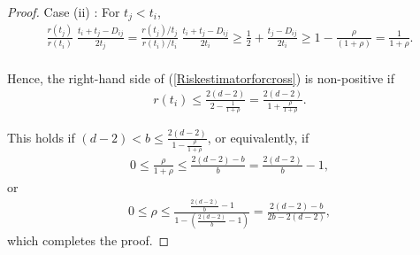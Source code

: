 \documentclass[10pt,a4paper]{amsart}
\begin{document}
\begin{proof}
{Case (ii) \hspace{-1mm}:} For $t_j < t_i$, 
  \begin{align}
   \nonumber   \frac{r(t_j)}{r(t_i)}\; \frac{t_i + t_j - D_{ij}}{2t_j} =  \frac{r(t_j)/t_j}{r(t_i)/t_i} \; \frac{t_i + t_j - D_{ij}}{2t_i}  \geq \frac{1}{2} + \frac{t_j  - D_{ij}}{2t_i}\geq 1 - \frac{\rho }{(1 + \rho)} = \frac{1}{1 + \rho}.
  \end{align}
\\


Hence, the right-hand side of (\ref{Riskestimatorforcross}) is non-positive if
\begin{align}
   \nonumber  r(t_i) \leq \frac{2(d - 2)}{2 - \frac{1}{1 + \rho}} = \frac{2(d - 2)}{1 + \frac{\rho}{1 + \rho}}.
\end{align}

This holds if $(d - 2) < b \leq \frac{2(d - 2)}{1 - \frac{\rho}{1 + \rho}}$, or equivalently, if 
\begin{align*}
    0 \leq \frac{\rho}{1 + \rho} \leq \frac{2(d - 2) - b}{b} = \frac{2(d - 2) }{b} - 1,
\end{align*}
or
\begin{align}
    0 \leq  \rho \leq \frac{\frac{2(d- 2)}{b} - 1}{1 - \left(\frac{2(d- 2)}{b} - 1\right)} = \frac{2(d - 2) - b}{2b - 2(d - 2)},
  \label{rho_bound_new}
  \end{align}
which completes the proof.
\end{proof}
\end{document}

